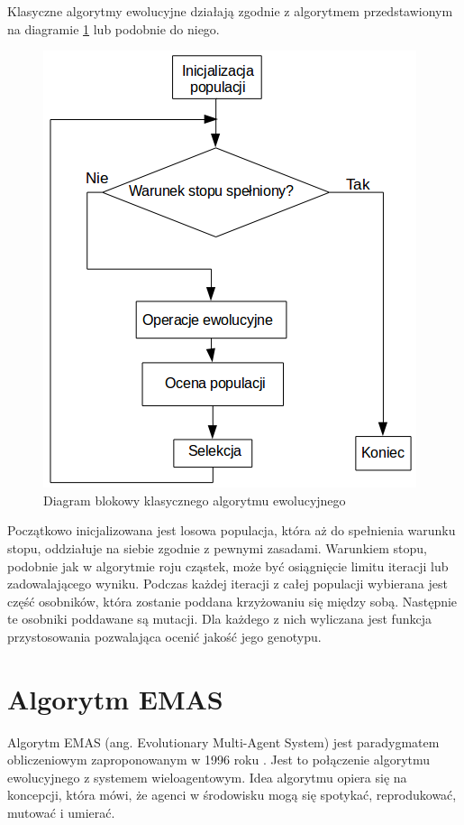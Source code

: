 Klasyczne algorytmy ewolucyjne działają zgodnie z algorytmem przedstawionym na diagramie \ref{fig:GAdiagram} lub podobnie do niego. 

\begin{figure}[H]
\begin{center} 
\includegraphics[scale=0.6]{tresc/pics/GAdiagram.png}
\caption{Diagram blokowy klasycznego algorytmu ewolucyjnego}
\label{fig:GAdiagram}
\end{center}
\end{figure}

Początkowo inicjalizowana jest losowa populacja, która aż do spełnienia warunku stopu, oddziałuje na siebie zgodnie z pewnymi zasadami. Warunkiem stopu, podobnie jak w algorytmie roju cząstek, może być osiągnięcie limitu iteracji lub zadowalającego wyniku. Podczas każdej iteracji z całej populacji wybierana jest część osobników, która zostanie poddana krzyżowaniu się między sobą. Następnie te osobniki poddawane są mutacji. Dla każdego z nich wyliczana jest funkcja przystosowania pozwalająca ocenić jakość jego genotypu.

\section{Algorytm EMAS}
\label{sec:emas}

Algorytm EMAS (ang. Evolutionary Multi-Agent System) jest paradygmatem obliczeniowym zaproponowanym w 1996 roku \cite{emas1}. Jest to połączenie algorytmu ewolucyjnego z systemem wieloagentowym. Idea algorytmu opiera się na koncepcji, która mówi, że agenci w środowisku mogą się spotykać, reprodukować, mutować i umierać. 


